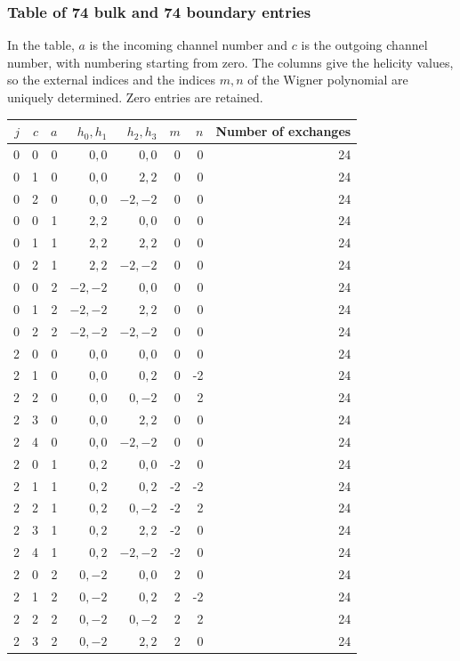 \documentclass[11pt,a4paper]{article}
\begin{document}
\subsubsection{Table of 74 bulk and 74 boundary entries}
\label{sec:cat-angular-table}
In the table, $a$ is the incoming channel number and $c$ is the outgoing channel number, with numbering starting from zero. The columns give the helicity values, so the external indices and the indices $m,n$ of the Wigner polynomial are uniquely determined. Zero entries are retained.
\begin{longtable}{rrrrrrrr}
$j$ & $c$ & $a$ & $h_0,h_1$ & $h_2,h_3$ & $m$ & $n$ & Number of exchanges\\\hline
0 & 0 & 0 & $0,0$ & $0,0$ & 0 & 0 & 24\\
0 & 1 & 0 & $0,0$ & $2,2$ & 0 & 0 & 24\\
0 & 2 & 0 & $0,0$ & $-2,-2$ & 0 & 0 & 24\\
0 & 0 & 1 & $2,2$ & $0,0$ & 0 & 0 & 24\\
0 & 1 & 1 & $2,2$ & $2,2$ & 0 & 0 & 24\\
0 & 2 & 1 & $2,2$ & $-2,-2$ & 0 & 0 & 24\\
0 & 0 & 2 & $-2,-2$ & $0,0$ & 0 & 0 & 24\\
0 & 1 & 2 & $-2,-2$ & $2,2$ & 0 & 0 & 24\\
0 & 2 & 2 & $-2,-2$ & $-2,-2$ & 0 & 0 & 24\\
2 & 0 & 0 & $0,0$ & $0,0$ & 0 & 0 & 24\\
2 & 1 & 0 & $0,0$ & $0,2$ & 0 & -2 & 24\\
2 & 2 & 0 & $0,0$ & $0,-2$ & 0 & 2 & 24\\
2 & 3 & 0 & $0,0$ & $2,2$ & 0 & 0 & 24\\
2 & 4 & 0 & $0,0$ & $-2,-2$ & 0 & 0 & 24\\
2 & 0 & 1 & $0,2$ & $0,0$ & -2 & 0 & 24\\
2 & 1 & 1 & $0,2$ & $0,2$ & -2 & -2 & 24\\
2 & 2 & 1 & $0,2$ & $0,-2$ & -2 & 2 & 24\\
2 & 3 & 1 & $0,2$ & $2,2$ & -2 & 0 & 24\\
2 & 4 & 1 & $0,2$ & $-2,-2$ & -2 & 0 & 24\\
2 & 0 & 2 & $0,-2$ & $0,0$ & 2 & 0 & 24\\
2 & 1 & 2 & $0,-2$ & $0,2$ & 2 & -2 & 24\\
2 & 2 & 2 & $0,-2$ & $0,-2$ & 2 & 2 & 24\\
2 & 3 & 2 & $0,-2$ & $2,2$ & 2 & 0 & 24\\

\end{longtable}
\end{document}
